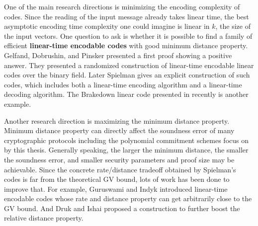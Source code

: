 One of the main research directions is minimizing the encoding complexity
of codes. Since the reading of the input message already takes linear time, the best asymptotic encoding time complexity one could imagine is linear in $k$, the size of the input vectors. One question to ask is whether it is possible to find a family of efficient \textbf{linear-time encodable codes} with good minimum distance property. Gelfand, Dobrushin, and Pinsker \cite{gelfand1973complexity} presented a first proof showing a positive answer. They presented a randomized construction of linear-time encodable linear codes over the binary field. Later Spielman \cite{DBLP:conf/stoc/Spielman95} gives an explicit construction of such codes, which includes both a linear-time encoding algorithm and a linear-time decoding algorithm. The Brakedown linear code presented in \cite{brakedown} recently is another example.

Another research direction is maximizing the minimum distance property. Minimum distance property can directly affect the soundness error of many cryptographic protocols including the polynomial commitment schemes focus on by this thesis. Generally speaking, the larger the minimum distance, the smaller the soundness error, and smaller security parameters and proof size may be achievable. Since the concrete rate/distance tradeoff obtained by Spielman’s codes is far from the theoretical GV bound, lots of work has been done to improve that. For example, Guruswami and Indyk \cite{DBLP:journals/tit/GuruswamiI05} introduced linear-time encodable codes whose rate and distance property can get arbitrarily close to the GV bound. And Druk and Ishai \cite{10.1145/2554797.2554815} proposed a construction to further boost the relative distance property. 





